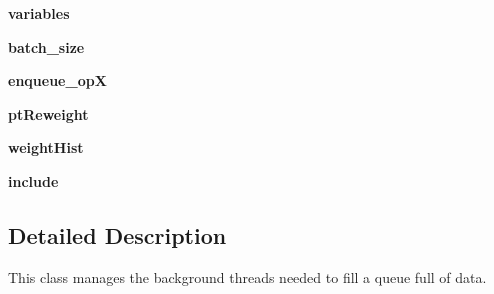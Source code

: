 \begin{DoxyCompactItemize}
\item 
\hypertarget{classCustomQueueRunner_1_1CustomQueueRunner_aa7bb789d918609955e2d755812855b33}{{\bfseries variables}}\label{classCustomQueueRunner_1_1CustomQueueRunner_aa7bb789d918609955e2d755812855b33}

\item 
\hypertarget{classCustomQueueRunner_1_1CustomQueueRunner_aed125859f24c11af006847d8c6613ca3}{{\bfseries batch\-\_\-size}}\label{classCustomQueueRunner_1_1CustomQueueRunner_aed125859f24c11af006847d8c6613ca3}

\item 
\hypertarget{classCustomQueueRunner_1_1CustomQueueRunner_a87afd27e4fba7b890ef7cf7056dd01be}{{\bfseries enqueue\-\_\-op\-X}}\label{classCustomQueueRunner_1_1CustomQueueRunner_a87afd27e4fba7b890ef7cf7056dd01be}

\item 
\hypertarget{classCustomQueueRunner_1_1CustomQueueRunner_aba53122c1cf237949531b1c016628c76}{{\bfseries pt\-Reweight}}\label{classCustomQueueRunner_1_1CustomQueueRunner_aba53122c1cf237949531b1c016628c76}

\item 
\hypertarget{classCustomQueueRunner_1_1CustomQueueRunner_a42ba75530a6b02c899654e679bf8ce87}{{\bfseries weight\-Hist}}\label{classCustomQueueRunner_1_1CustomQueueRunner_a42ba75530a6b02c899654e679bf8ce87}

\item 
\hypertarget{classCustomQueueRunner_1_1CustomQueueRunner_a0dd24c6c65451a0cb308225107dee05a}{{\bfseries include}}\label{classCustomQueueRunner_1_1CustomQueueRunner_a0dd24c6c65451a0cb308225107dee05a}

\end{DoxyCompactItemize}


\subsection{Detailed Description}
\begin{DoxyVerb}This class manages the background threads needed to fill
    a queue full of data.
\end{DoxyVerb}
 

